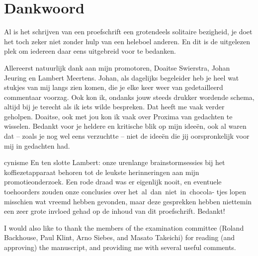 \chapter*{Dankwoord}
\label{chap:dank}



Al is het schrijven van een proefschrift een grotendeels solitaire bezigheid, je doet het toch zeker niet zonder hulp van een heleboel anderen. En dit is de uitgelezen plek om iedereen daar eens uitgebreid voor te bedanken.

Allereerst natuurlijk dank aan mijn promotoren, Doaitse Swierstra, Johan Jeuring en Lambert Meertens. Johan, als dagelijks begeleider heb je heel wat stukjes van mij langs zien komen, die je elke keer  weer van gedetailleerd commentaar voorzag. Ook kon ik, ondanks jouw steeds drukker wordende schema, altijd bij je terecht als ik iets wilde bespreken. Dat heeft me vaak verder geholpen. Doaitse, ook met jou kon ik vaak  over Proxima van gedachten te wisselen. Bedankt voor je heldere en kritische blik op mijn idee\"en, ook al waren dat -- zoals je nog wel eens verzuchtte -- niet de idee\"en die jij oorspronkelijk voor mij in gedachten had.

\bc cynisme \ec 
En ten slotte Lambert: onze urenlange brainstormsessies bij het koffiezetapparaat behoren tot de leukste herinneringen aan mijn promotieonderzoek. Een rode draad was er eigenlijk nooit, en eventuele toehoorders zouden onze conclusies over het~al~dan~niet~in~chocola- tjes lopen misschien wat vreemd hebben gevonden, maar deze gesprekken hebben niettemin een zeer grote invloed gehad op de inhoud van dit proefschrift. Bedankt!


I would also like to thank the members of the examination committee (Roland Backhouse, Paul Klint, Arno Siebes, and Masato Takeichi) for reading (and approving) the manuscript, and providing me with several useful comments.

